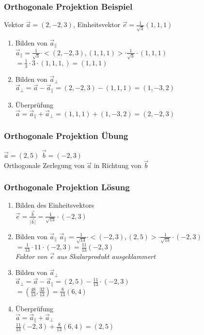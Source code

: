 \begin{frame}
	\frametitle{Orthogonale Projektion Beispiel}
	Vektor $\vec{a} = (2, -2, 3)$, Einheitsvektor $\vec{e} = \frac{1}{\sqrt{3}}(1, 1, 1)$\\

    \begin{enumerate}
        \item Bilden von $\vec{a}_{\parallel}$\\
        $\vec{a}_{\parallel} = \frac{1}{\sqrt{3}} \cdot <(2, -2, 3), (1, 1, 1)> \cdot \frac{1}{\sqrt{3}} \cdot (1, 1, 1)$
        $= \frac{1}{3} \cdot 3 \cdot (1, 1, 1,) = (1, 1, 1)$
        \item Bilden von $\vec{a}_{\perp}$\\
        $\vec{a}_{\perp} = \vec{a} - \vec{a}_{\parallel} = (2, -2, 3) - (1, 1, 1) = (1, -3 , 2)$
        \item Überprüfung\\
        $\vec{a} = \vec{a}_{\parallel} + \vec{a}_{\perp} = (1, 1, 1) + (1, -3, 2) = (2, -2, 3)$
    \end{enumerate}
\end{frame}
	

\begin{frame}
	\frametitle{Orthogonale Projektion Übung}
	$\vec{a} = (2, 5)$ $\vec{b} = (-2, 3)$\\
	Orthogonale Zerlegung von $\vec{a}$ in Richtung von $\vec{b}$
\end{frame}


\begin{frame}
	\frametitle{Orthogonale Projektion Lösung}
    \begin{enumerate}
        \item Bilden des Einheitsvektors \\
        $\vec{e} = \frac{\vec{b}}{\lvert \vec{b} \rvert} = \frac{1}{\sqrt{13}} \cdot (-2, 3)$\\
        \item Bilden von $\vec{a}_{\parallel}$
        $\vec{a}_{\parallel} = \frac{1}{\sqrt{13}} \cdot <(-2, 3), (2, 5)> \cdot \frac{1}{\sqrt{13}} \cdot (-2, 3)$ \\
        $= \frac{1}{13} \cdot 11 \cdot (-2, 3) = \frac{11}{13}(-2, 3)$\\
        \textit{Faktor von $\vec{e}$  aus Skalarprodukt ausgeklammert}\\
        \item Bilden von $\vec{a}_{\perp}$ \\
        $\vec{a}_{\perp} = \vec{a} - \vec{a}_{\parallel} = (2, 5) - \frac{11}{13} \cdot (-2, 3)$\\
        $= (\frac{48}{13}, \frac{32}{13}) = \frac{8}{13}(6, 4)$\\
        \item Überprüfung \\
        $\vec{a} = \vec{a}_{\parallel} + \vec{a}_{\perp}$\\
        $\frac{11}{13}(-2, 3) + \frac{8}{13}(6, 4) = (2, 5)$ \\
    \end{enumerate}
\end{frame}
